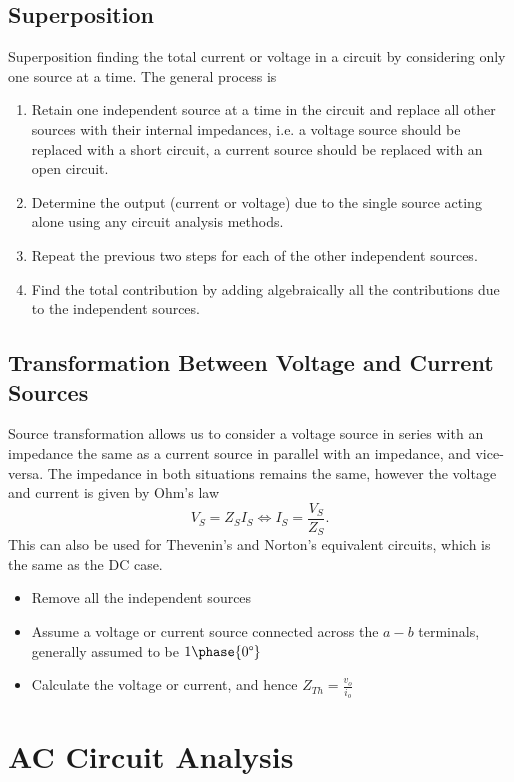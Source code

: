 \documentclass{article}
\begin{document}
\subsection{Superposition}
Superposition finding the total current or voltage in a circuit by considering only one source at a time. The general process is
\begin{enumerate}
    \item Retain one independent source at a time in the circuit and replace all other sources with their internal impedances, i.e. a voltage source should be replaced with a short circuit, a current source should be replaced with an open circuit.
    \item Determine the output (current or voltage) due to the single source acting alone using any circuit analysis methods.
    \item Repeat the previous two steps for each of the other independent sources.
    \item Find the total contribution by adding algebraically all the contributions due to the independent sources.
\end{enumerate}

\subsection{Transformation Between Voltage and Current Sources}
Source transformation allows us to consider a voltage source in series with an impedance the same as a current source in parallel with an impedance, and vice-versa. The impedance in both situations remains the same, however the voltage and current is given by Ohm's law 
\[
    V_S=Z_SI_S \iff I_S=\frac{V_S}{Z_S}.
\]
This can also be used for Thevenin's and Norton's equivalent circuits, which is the same as the DC case.
\begin{itemize}
    \item Remove all the independent sources
    \item Assume a voltage or current source connected across the $a-b$ terminals, generally assumed to be $1\phase{0\degree}$
    \item Calculate the voltage or current, and hence $Z_{Th}=\frac{v_o}{i_o}$
\end{itemize}

\section{AC Circuit Analysis}
\end{document}
